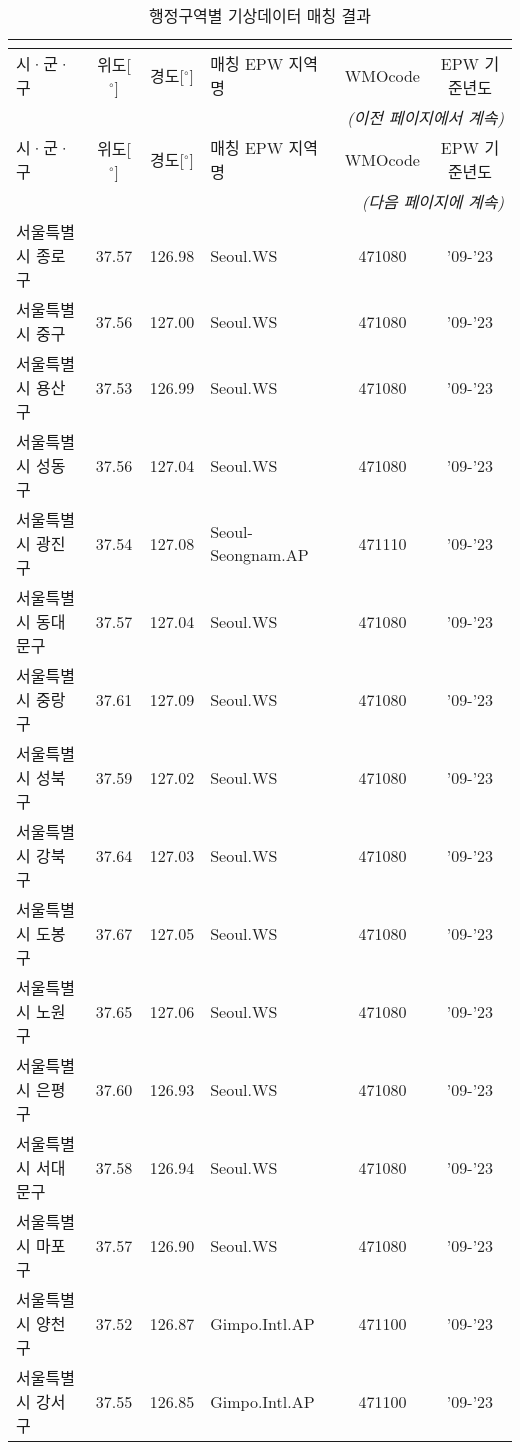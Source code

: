 \renewcommand{\arraystretch}{0.8}
\begin{longtable}{lcclcc}
  \caption{행정구역별 기상데이터 매칭 결과} \\
  \label{tab:weather_mapping} \\
  \toprule
  \small
  시·군·구 & 위도[$^\circ$] & 경도[$^\circ$] & 매칭 EPW 지역명 & WMOcode & EPW 기준년도 \\ \midrule
  \endfirsthead
  \multicolumn{6}{r}{\textit{(이전 페이지에서 계속)}} \\ \toprule
  시·군·구 & 위도[$^\circ$] & 경도[$^\circ$] & 매칭 EPW 지역명 & WMOcode & EPW 기준년도 \\ \midrule
  \endhead
  \midrule \multicolumn{6}{r}{\textit{(다음 페이지에 계속)}} \\ \bottomrule
  \endfoot
  \bottomrule
  \endlastfoot
  서울특별시 종로구 & 37.57 & 126.98 & Seoul.WS & 471080 & '09-'23 \\
  서울특별시 중구 & 37.56 & 127.00 & Seoul.WS & 471080 & '09-'23 \\
  서울특별시 용산구 & 37.53 & 126.99 & Seoul.WS & 471080 & '09-'23 \\
  서울특별시 성동구 & 37.56 & 127.04 & Seoul.WS & 471080 & '09-'23 \\
  서울특별시 광진구 & 37.54 & 127.08 & Seoul-Seongnam.AP & 471110 & '09-'23 \\
  서울특별시 동대문구 & 37.57 & 127.04 & Seoul.WS & 471080 & '09-'23 \\
  서울특별시 중랑구 & 37.61 & 127.09 & Seoul.WS & 471080 & '09-'23 \\
  서울특별시 성북구 & 37.59 & 127.02 & Seoul.WS & 471080 & '09-'23 \\
  서울특별시 강북구 & 37.64 & 127.03 & Seoul.WS & 471080 & '09-'23 \\
  서울특별시 도봉구 & 37.67 & 127.05 & Seoul.WS & 471080 & '09-'23 \\
  서울특별시 노원구 & 37.65 & 127.06 & Seoul.WS & 471080 & '09-'23 \\
  서울특별시 은평구 & 37.60 & 126.93 & Seoul.WS & 471080 & '09-'23 \\
  서울특별시 서대문구 & 37.58 & 126.94 & Seoul.WS & 471080 & '09-'23 \\
  서울특별시 마포구 & 37.57 & 126.90 & Seoul.WS & 471080 & '09-'23 \\
  서울특별시 양천구 & 37.52 & 126.87 & Gimpo.Intl.AP & 471100 & '09-'23 \\
  서울특별시 강서구 & 37.55 & 126.85 & Gimpo.Intl.AP & 471100 & '09-'23 \\

\end{longtable}
